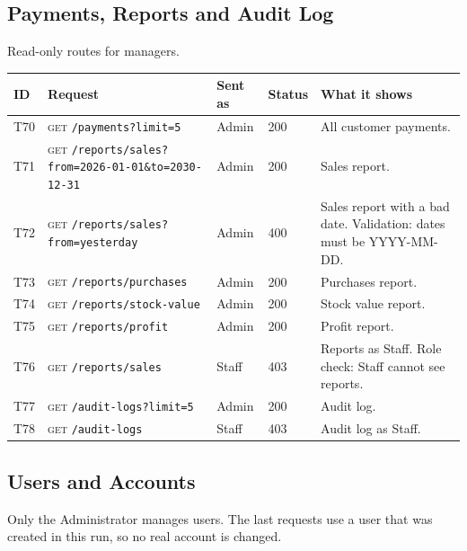 \documentclass[11pt,a4paper]{article}
\newcommand{\code}[1]{\texttt{#1}}
\begin{document}
\subsection{Payments, Reports and Audit Log}
Read-only routes for managers.

\begin{longtable}{@{}P{0.7cm}P{5.0cm}P{1.3cm}P{1.15cm}P{5.75cm}@{}}
\toprule
\textbf{ID} & \textbf{Request} & \textbf{Sent as} & \textbf{Status} & \textbf{What it shows} \\
\midrule
\endhead
T70 & \textsc{get} \code{/\allowbreak{}payments?\allowbreak{}limit=\allowbreak{}5} & Admin & 200 & All customer payments. \\
T71 & \textsc{get} \code{/\allowbreak{}reports/\allowbreak{}sales?\allowbreak{}from=\allowbreak{}2026-01-01\&\allowbreak{}to=\allowbreak{}2030-12-31} & Admin & 200 & Sales report. \\
T72 & \textsc{get} \code{/\allowbreak{}reports/\allowbreak{}sales?\allowbreak{}from=\allowbreak{}yesterday} & Admin & 400 & Sales report with a bad date. Validation: dates must be YYYY-MM-DD. \\
T73 & \textsc{get} \code{/\allowbreak{}reports/\allowbreak{}purchases} & Admin & 200 & Purchases report. \\
T74 & \textsc{get} \code{/\allowbreak{}reports/\allowbreak{}stock-value} & Admin & 200 & Stock value report. \\
T75 & \textsc{get} \code{/\allowbreak{}reports/\allowbreak{}profit} & Admin & 200 & Profit report. \\
T76 & \textsc{get} \code{/\allowbreak{}reports/\allowbreak{}sales} & Staff & 403 & Reports as Staff. Role check: Staff cannot see reports. \\
T77 & \textsc{get} \code{/\allowbreak{}audit-logs?\allowbreak{}limit=\allowbreak{}5} & Admin & 200 & Audit log. \\
T78 & \textsc{get} \code{/\allowbreak{}audit-logs} & Staff & 403 & Audit log as Staff. \\
\bottomrule
\end{longtable}

\subsection{Users and Accounts}
Only the Administrator manages users. The last requests use a user that was created in this run, so no real account is changed.
\end{document}
